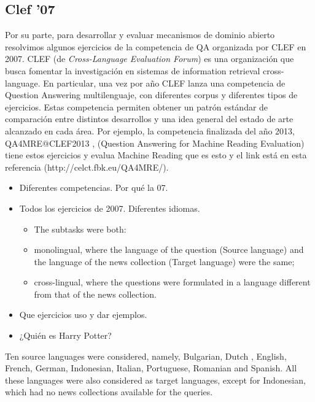 \subsection{Clef '07}
Por su parte, para desarrollar y evaluar mecanismos de dominio abierto resolvimos algunos ejercicios de la competencia de QA organizada por CLEF 
en 2007. 
CLEF (de \textit{Cross-Language Evaluation Forum}) es una organización que busca fomentar la investigación en sistemas de information retrieval cross-language. 
En particular, una vez por año CLEF lanza una competencia de Question Answering multilenguaje, con diferentes corpus y diferentes tipos de ejercicios. Estas competencia permiten obtener un patrón estándar de comparación entre distintos desarrollos y una idea general del estado de arte alcanzado en cada área.
Por ejemplo, la competencia finalizada del año 2013, QA4MRE@CLEF2013 \cite{Clef07}, (Question Answering for Machine Reading Evaluation) tiene estos ejercicios y evalua Machine Reading que es esto y el link está en esta referencia (http://celct.fbk.eu/QA4MRE/).

\begin{itemize}
\item Diferentes competencias. Por qué la 07.
\item Todos los ejercicios de 2007. Diferentes idiomas. 
\begin{itemize}
\item The subtasks were both:
\item monolingual, where the language of the question (Source language) and the language of the news
collection (Target language) were the same;
\item cross-lingual, where the questions were formulated in a language different from that of the news
collection.
\end{itemize}
\item Que ejercicios uso y dar ejemplos. 
\item ¿Quién es Harry Potter?
\end{itemize}

Ten source languages were considered, namely, Bulgarian, Dutch , English, French, German, Indonesian, Italian,
Portuguese, Romanian and Spanish. All these languages were also considered as target languages, except for
Indonesian, which had no news collections available for the queries.

 
